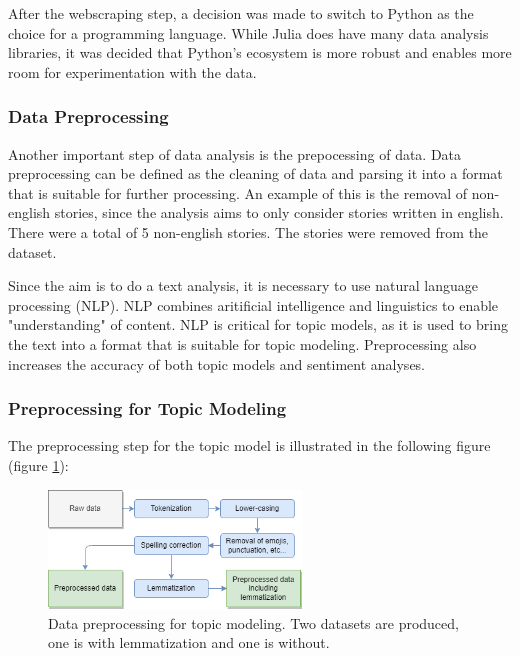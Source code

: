 After the webscraping step, a decision was made to switch to Python as the choice for a programming language. While Julia does have many data analysis libraries, it was decided that Python's ecosystem is more robust and enables more room for experimentation with the data. 

\subsubsection{Data Preprocessing}

Another important step of data analysis is the prepocessing of data. Data preprocessing can be defined as the cleaning of data and parsing it into a format that is suitable for further processing. An example of this is the removal of non-english stories, since the analysis aims to only consider stories written in english. There were a total of 5 non-english stories. The stories were removed from the dataset.

Since the aim is to do a text analysis, it is necessary to use natural language processing (NLP). NLP combines aritificial intelligence and linguistics to enable "understanding" of content. NLP is critical for topic models, as it is used to bring the text into a format that is suitable for topic modeling. Preprocessing also increases the accuracy of both topic models and sentiment analyses.~\cite{haddi2013role}\cite{chauhan2021topic}

\subsubsection*{Preprocessing for Topic Modeling}

The preprocessing step for the topic model is illustrated in the following figure (figure \ref{fig:preprocessing_topic_modeling}):

\begin{figure}[h]
    \centering
    \includegraphics[width=0.6\textwidth]{resources/preprocessing_topic_modeling.png}
    \caption{Data preprocessing for topic modeling. Two datasets are produced, one is with lemmatization and one is without.}
    \label{fig:preprocessing_topic_modeling}
\end{figure}

